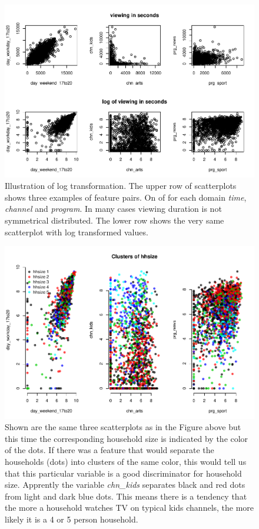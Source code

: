 \documentclass[]{article}
\begin{document}
\begin{figure}
\centering
\includegraphics{Diploma_files/figure-latex/fig3-1.pdf}
\caption{\label{fig:fig3} Illustration of log transformation. The upper
row of scatterplots shows three examples of feature pairs. On of for
each domain \emph{time}, \emph{channel} and \emph{program}. In many
cases viewing duration is not symmetrical distributed. The lower row
shows the very same scatterplot with log transformed values.}
\end{figure}

\begin{figure}
\centering
\includegraphics{Diploma_files/figure-latex/fig4-1.pdf}
\caption{\label{fig:fig4} Shown are the same three scatterplots as in
the Figure above but this time the corresponding household size is
indicated by the color of the dots. If there was a feature that would
separate the households (dots) into clusters of the same color, this
would tell us that this particular variable is a good discriminator for
household size. Apprently the variable \emph{chn\_kids} separates black
and red dots from light and dark blue dots. This means there is a
tendency that the more a household watches TV on typical kids channels,
the more likely it is a 4 or 5 person household.}
\end{figure}
\end{document}
